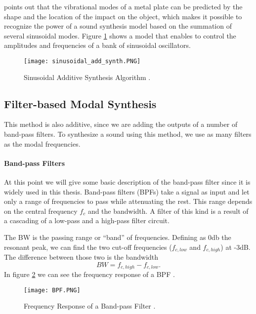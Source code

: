 \cite{Cook:2002:RSS:515316} points out that the vibrational modes of a  metal plate can be predicted by the shape and the location of the impact on the object, which makes it possible to recognize the power of a sound synthesis model based on the summation of several sinusoidal modes. Figure \ref{fig:sin_add_synth} shows a model that enables to control the amplitudes and frequencies of a bank of sinusoidal oscillators.

\begin{figure}[H]
  \centering
    \texttt{[image: sinusoidal\_add\_synth.PNG]}
      \caption{Sinusoidal Additive Synthesis Algorithm \cite{Cook:2002:RSS:515316}.}
      \label{fig:sin_add_synth}
\end{figure}

\subsection{Filter-based Modal Synthesis}\label{sec:add_synth}

This method is also additive, since we are adding the outputs of a number of band-pass filters. To synthesize a sound using this method, we use as many filters as the modal frequencies.

\paragraph{Band-pass Filters\\}\label{par:bpf}

At this point we will give some basic description of the band-pass filter since it is widely used in this thesis. Band-pass filters (\gls{BPF}s) take a signal as input and let only a range of frequencies to pass while attenuating the rest. This range depends on the central frequency $f_c$ and the bandwidth. A filter of this kind is a result of a cascading of a low-pass and a high-pass filter circuit.

The \gls{BW} is the passing range or ``band'' of frequencies. Defining as 0db the resonant peak, we can find the two cut-off frequencies ($f_{c,low}$ and $f_{c,high}$) at -3dB. The difference between those two is the bandwidth  
\begin{equation}\label{eq:bw}
BW = f_{c,high}-f_{c,low}.
\end{equation}   
In figure \ref{fig:resp_bpf} we can see the frequency response of a BPF \cite{bib:bpf}. 

\begin{figure}[H]
  \centering
    \texttt{[image: BPF.PNG]}
      \caption{Frequency Response of a Band-pass Filter  \cite{bib:bpf}.}
      \label{fig:resp_bpf}
\end{figure}

